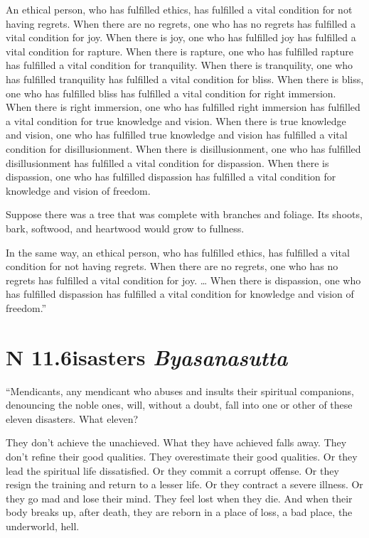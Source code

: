 \documentclass[12pt,openany]{book}%
\newcommand*{\suttatitleacronym}[1]{\smaller[2]{#1}\vspace*{.3em}}
\newcommand*{\suttatitletranslation}[1]{\linebreak{#1}}
\newcommand*{\suttatitleroot}[1]{\linebreak\smaller[2]\itshape{#1}}
\newcommand*{\tocacronym}[1]{\hspace*{-3.3em}{#1}\quad}
\newcommand*{\toctranslation}[1]{#1}
\newcommand*{\tocroot}[1]{(\textit{#1})}
\begin{document}
An ethical person, who has fulfilled ethics, has fulfilled a vital condition for not having regrets. When there are no regrets, one who has no regrets has fulfilled a vital condition for joy. When there is joy, one who has fulfilled joy has fulfilled a vital condition for rapture. When there is rapture, one who has fulfilled rapture has fulfilled a vital condition for tranquility. When there is tranquility, one who has fulfilled tranquility has fulfilled a vital condition for bliss. When there is bliss, one who has fulfilled bliss has fulfilled a vital condition for right immersion. When there is right immersion, one who has fulfilled right immersion has fulfilled a vital condition for true knowledge and vision. When there is true knowledge and vision, one who has fulfilled true knowledge and vision has fulfilled a vital condition for disillusionment. When there is disillusionment, one who has fulfilled disillusionment has fulfilled a vital condition for dispassion. When there is dispassion, one who has fulfilled dispassion has fulfilled a vital condition for knowledge and vision of freedom. 

Suppose there was a tree that was complete with branches and foliage. Its shoots, bark, softwood, and heartwood would grow to fullness. 

In the same way, an ethical person, who has fulfilled ethics, has fulfilled a vital condition for not having regrets. When there are no regrets, one who has no regrets has fulfilled a vital condition for joy. … When there is dispassion, one who has fulfilled dispassion has fulfilled a vital condition for knowledge and vision of freedom.” 

%
\section*{{\suttatitleacronym AN 11.6}{\suttatitletranslation Disasters }{\suttatitleroot Byasanasutta}}
\addcontentsline{toc}{section}{\tocacronym{AN 11.6} \toctranslation{Disasters } \tocroot{Byasanasutta}}

“Mendicants, any mendicant who abuses and insults their spiritual companions, denouncing the noble ones, will, without a doubt, fall into one or other of these eleven disasters. What eleven? 

They don’t achieve the unachieved. What they have achieved falls away. They don’t refine their good qualities. They overestimate their good qualities. Or they lead the spiritual life dissatisfied. Or they commit a corrupt offense. Or they resign the training and return to a lesser life. Or they contract a severe illness. Or they go mad and lose their mind. They feel lost when they die. And when their body breaks up, after death, they are reborn in a place of loss, a bad place, the underworld, hell. 
\end{document}

